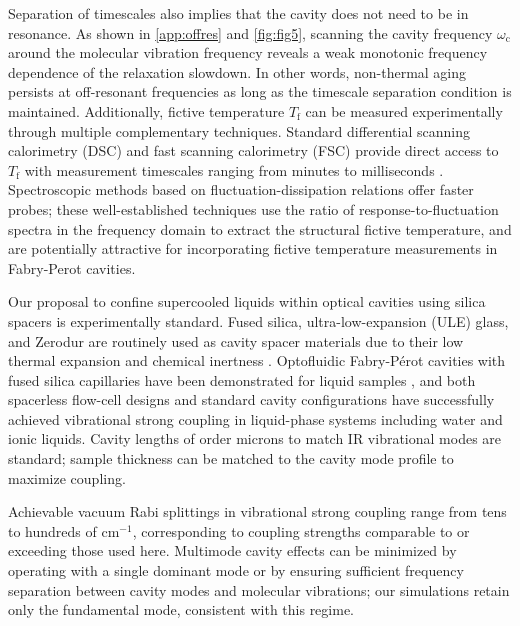 Separation of timescales also implies that the cavity does not need to be in resonance. As shown in \cref{app:offres} and \cref{fig:fig5}, scanning the cavity frequency $\omega_\mathrm{c}$ around the molecular vibration frequency reveals a weak monotonic frequency dependence of the relaxation slowdown. In other words, non-thermal aging persists at off-resonant frequencies as long as the timescale separation condition is maintained. Additionally, fictive temperature $T_\mathrm{f}$ can be measured experimentally through multiple complementary techniques. Standard differential scanning calorimetry (DSC) and fast scanning calorimetry (FSC) provide direct access to $T_\mathrm{f}$ with measurement timescales ranging from minutes to milliseconds \cite{elbanna2023challenging}. Spectroscopic methods based on fluctuation-dissipation relations offer faster probes; these well-established techniques use the ratio of response-to-fluctuation spectra in the frequency domain to extract the structural fictive temperature,\cite{grigera1999observation,henot2024crossing,zhang2021unifying} and are potentially attractive for incorporating fictive temperature measurements in Fabry-Perot cavities. %


Our proposal to confine supercooled liquids within optical cavities using silica spacers is experimentally standard. Fused silica, ultra-low-expansion (ULE) glass, and Zerodur are routinely used as cavity spacer materials due to their low thermal expansion and chemical inertness \cite{berthold1977dimensional,legero2010tuning,smid2012evaluation}. Optofluidic Fabry-P\'erot cavities with fused silica capillaries have been demonstrated for liquid samples \cite{gaber2015volume}, and both spacerless flow-cell designs \cite{yamada2022spacerless} and standard cavity configurations \cite{fukushima2022inherent} have successfully achieved vibrational strong coupling in liquid-phase systems including water and ionic liquids. Cavity lengths of order microns to match IR vibrational modes are standard; sample thickness can be matched to the cavity mode profile to maximize coupling.

Achievable vacuum Rabi splittings in vibrational strong coupling range from tens to hundreds of cm$^{-1}$, corresponding to coupling strengths comparable to or exceeding those used here.\cite{li2020cavity,fukushima2022inherent} Multimode cavity effects can be minimized by operating with a single dominant mode or by ensuring sufficient frequency separation between cavity modes and molecular vibrations; our simulations retain only the fundamental mode, consistent with this regime.

